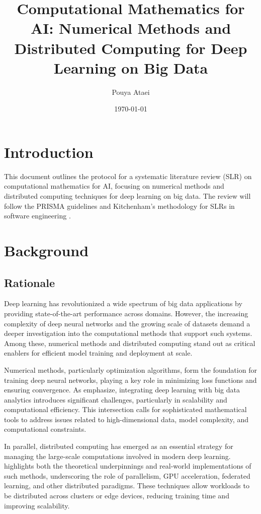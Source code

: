 \documentclass[a4paper,12pt]{acm/acmart}
\title{Computational Mathematics for AI: Numerical Methods and Distributed Computing for Deep Learning on Big Data}
\author{Pouya Ataei}
\date{\today}
\begin{document}
\maketitle

\section{Introduction}\label{sec:introduction}
This document outlines the protocol for a systematic literature review (SLR) on computational mathematics for AI, focusing on numerical methods and distributed computing techniques for deep learning on big data. The review will follow the PRISMA guidelines \citep{moher2009preferred} and Kitchenham's methodology for SLRs in software engineering \citep{kitchenham2007guidelines}.


\section{Background}\label{sec:background}
\subsection{Rationale}\label{subsec:rationale}
Deep learning has revolutionized a wide spectrum of big data applications by providing state-of-the-art performance across domains.
However, the increasing complexity of deep neural networks and the growing scale of datasets demand a deeper investigation into
the computational methods that support such systems. Among these, numerical methods and distributed computing stand out as critical
enablers for efficient model training and deployment at scale.

Numerical methods, particularly optimization algorithms, form the foundation for training deep neural networks, playing a key role
in minimizing loss functions and ensuring convergence. As \citet{najafabadi2015deep} emphasize, integrating deep learning with
big data analytics introduces significant challenges, particularly in scalability and computational efficiency.
This intersection calls for sophisticated mathematical tools to address issues related to high-dimensional data, model complexity,
and computational constraints.

In parallel, distributed computing has emerged as an essential strategy for managing the large-scale computations involved in
modern deep learning. \citet{yan2023computational} highlights both the theoretical underpinnings and real-world implementations of such methods,
underscoring the role of parallelism, GPU acceleration, federated learning, and other distributed paradigms.
These techniques allow workloads to be distributed across clusters or edge devices, reducing training time and improving scalability.
\end{document}
